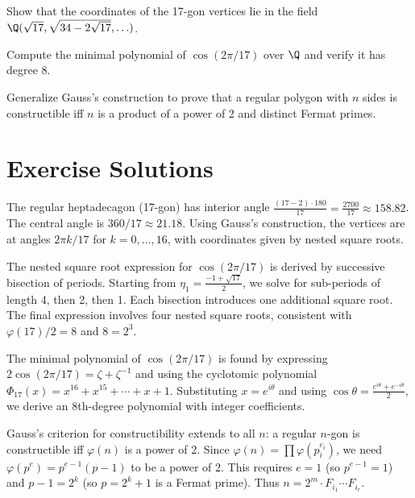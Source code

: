 \begin{exercise}
Show that the coordinates of the 17-gon vertices lie in the field $\Q(\sqrt{17}, \sqrt{34-2\sqrt{17}}, \ldots)$.
\end{exercise}

\begin{exercise}
Compute the minimal polynomial of $\cos(2\pi/17)$ over $\Q$ and verify it has degree 8.
\end{exercise}

\begin{exercise}
Generalize Gauss's construction to prove that a regular polygon with $n$ sides is constructible iff $n$ is a product of a power of 2 and distinct Fermat primes.
\end{exercise}



\section{Exercise Solutions}

\begin{solution}
The regular heptadecagon (17-gon) has interior angle $\frac{(17-2) \cdot 180}{17} = \frac{2700}{17} \approx 158.82$. The central angle is $360/17 \approx 21.18$. Using Gauss's construction, the vertices are at angles $2\pi k/17$ for $k = 0, \ldots, 16$, with coordinates given by nested square roots.
\end{solution}

\begin{solution}
The nested square root expression for $\cos(2\pi/17)$ is derived by successive bisection of periods. Starting from $\eta_1 = \frac{-1+\sqrt{17}}{2}$, we solve for sub-periods of length 4, then 2, then 1. Each bisection introduces one additional square root. The final expression involves four nested square roots, consistent with $\varphi(17)/2 = 8$ and $8 = 2^3$.
\end{solution}

\begin{solution}
The minimal polynomial of $\cos(2\pi/17)$ is found by expressing $2\cos(2\pi/17) = \zeta + \zeta^{-1}$ and using the cyclotomic polynomial $\Phi_{17}(x) = x^{16} + x^{15} + \cdots + x + 1$. Substituting $x = e^{i\theta}$ and using $\cos\theta = \frac{e^{i\theta}+e^{-i\theta}}{2}$, we derive an 8th-degree polynomial with integer coefficients.
\end{solution}

\begin{solution}
Gauss's criterion for constructibility extends to all $n$: a regular $n$-gon is constructible iff $\varphi(n)$ is a power of 2. Since $\varphi(n) = \prod \varphi(p_i^{e_i})$, we need $\varphi(p^e) = p^{e-1}(p-1)$ to be a power of 2. This requires $e = 1$ (so $p^{e-1}=1$) and $p-1 = 2^k$ (so $p = 2^k+1$ is a Fermat prime). Thus $n = 2^m \cdot F_{i_1} \cdots F_{i_r}$.
\end{solution}


